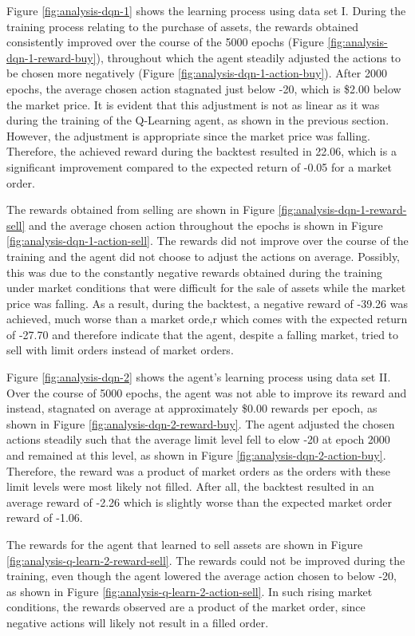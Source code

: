 Figure \ref{fig:analysis-dqn-1} shows the learning process using data set I.
During the training process relating to the purchase of assets, the rewards obtained consistently improved over the course of the 5000 epochs (Figure \ref{fig:analysis-dqn-1-reward-buy}), throughout which the agent steadily adjusted the actions to be chosen more negatively (Figure \ref{fig:analysis-dqn-1-action-buy}).
After 2000 epochs, the average chosen action stagnated just below -20, which is \$2.00 below the market price.
It is evident that this adjustment is not as linear as it was during the training of the Q-Learning agent, as shown in the previous section.
However, the adjustment is appropriate since the market price was falling.
Therefore, the achieved reward during the backtest resulted in 22.06, which is a significant improvement compared to the expected return of -0.05 for a market order.

The rewards obtained from selling are shown in Figure \ref{fig:analysis-dqn-1-reward-sell} and the average chosen action throughout the epochs is shown in Figure \ref{fig:analysis-dqn-1-action-sell}.
The rewards did not improve over the course of the training and the agent did not choose to adjust the actions on average.
Possibly, this was due to the constantly negative rewards obtained during the training under market conditions that were difficult for the sale of assets while the market price was falling.
As a result, during the backtest, a negative reward of -39.26 was achieved, much worse than a market orde,r which comes with the expected return of -27.70 and therefore indicate that the agent, despite a falling market, tried to sell with limit orders instead of market orders.

Figure \ref{fig:analysis-dqn-2} shows the agent's learning process using data set II.
Over the course of 5000 epochs, the agent was not able to improve its reward and instead, stagnated on average at approximately \$0.00 rewards per epoch, as shown in Figure \ref{fig:analysis-dqn-2-reward-buy}.
The agent adjusted the chosen actions steadily such that the average limit level fell to elow -20 at epoch 2000 and remained at this level, as shown in Figure \ref{fig:analysis-dqn-2-action-buy}.
Therefore, the reward was a product of market orders as the orders with these limit levels were most likely not filled.
After all, the backtest resulted in an average reward of -2.26 which is slightly worse than the expected market order reward of -1.06.

The rewards for the agent that learned to sell assets are shown in Figure \ref{fig:analysis-q-learn-2-reward-sell}.
The rewards could not be improved during the training, even though the agent lowered the average action chosen to below -20, as shown in Figure \ref{fig:analysis-q-learn-2-action-sell}.
In such rising market conditions, the rewards observed are a product of the market order, since negative actions will likely not result in a filled order.

